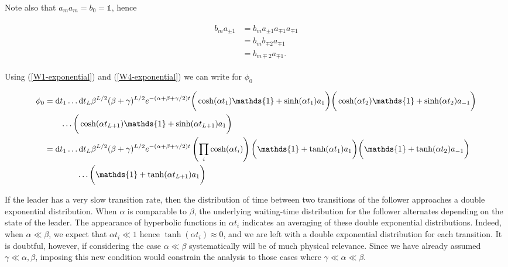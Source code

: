 Note also that $a_ma_m = b_0 = \mathds{1}$, hence

\begin{align}
\begin{split}
b_ma_{\pm 1} &= b_ma_{\pm 1}a_{\mp 1}a_{\mp 1} \\
&= b_mb_{\mp 2} a_{\mp 1}\\
&= b_{m \mp 2}a_{\mp 1}.
\end{split}
\end{align}

Using (\ref{W1-exponential}) and (\ref{W4-exponential}) we can write for $\phi_0$

\begin{align}\label{phi0_factorised}
\begin{split}
\phi_0 &= \rmd t_1 \ldots \rmd t_L \beta^{L/2}(\beta + \gamma)^{L/2} e^{-(\alpha + \beta +\gamma/2)t}\bigg(\cosh(\alpha t_1)\mathds{1} + \sinh(\alpha t_1) a_1 \bigg)\bigg(\cosh(\alpha t_2)\mathds{1} + \sinh(\alpha t_2) a_{-1} \bigg)\\
&\quad \quad \ldots\bigg(\cosh(\alpha t_{L+1})\mathds{1} + \sinh(\alpha t_{L+1}) a_1 \bigg) \\ 
&= \rmd t_1 \ldots \rmd t_L \beta^{L/2}(\beta + \gamma)^{L/2}e^{-(\alpha + \beta +\gamma/2)t}\left (\prod_i \cosh(\alpha t_i) \right)\bigg( \mathds{1} + \tanh(\alpha t_1) a_1\bigg)\bigg( \mathds{1} + \tanh(\alpha t_2) a_{-1}\bigg)\\ &\quad \quad \quad \quad \ldots\bigg(\mathds{1} + \tanh(\alpha t_{L+1})a_1\bigg)  
\end{split}
\end{align}

If the leader has a very slow transition rate, then the distribution of time between two transitions of the follower approaches a double exponential distribution. When $\alpha$ is comparable to $\beta$, the underlying waiting-time distribution for the follower alternates depending on the state of the leader. The appearance of hyperbolic functions in $\alpha t_i$ indicates an averaging of these double exponential distributions. Indeed, when $\alpha \ll \beta$, we expect that $\alpha t_i \ll 1$ hence $\tanh (\alpha t_i) \approx 0$, and we are left with a double exponential distribution for each transition. It is doubtful, however, if considering the case $\alpha \ll \beta$ systematically will be of much physical relevance. Since we have already assumed $\gamma \ll \alpha, \beta$, imposing this new condition would constrain the analysis to those cases where $\gamma \ll \alpha \ll \beta$.

